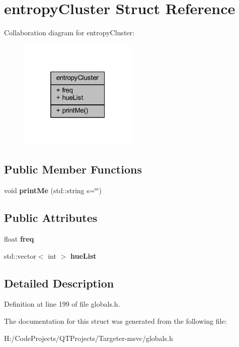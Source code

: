 \hypertarget{structentropy_cluster}{}\section{entropy\+Cluster Struct Reference}
\label{structentropy_cluster}


Collaboration diagram for entropy\+Cluster\+:
\nopagebreak
\begin{figure}[H]
\begin{center}
\leavevmode
\includegraphics[width=160pt]{structentropy_cluster__coll__graph}
\end{center}
\end{figure}
\subsection*{Public Member Functions}
\begin{DoxyCompactItemize}
\item 
\mbox{\label{structentropy_cluster_ac7bd664b978fbd56bea06eeadea3811c}} 
void {\bfseries print\+Me} (std\+::string s=\char`\"{}\char`\"{})
\end{DoxyCompactItemize}
\subsection*{Public Attributes}
\begin{DoxyCompactItemize}
\item 
\mbox{\label{structentropy_cluster_a3c49f6a3e21a396c409973ddf5a6c93e}} 
float {\bfseries freq}
\item 
\mbox{\label{structentropy_cluster_a3883cd312666c9aa28dfdd57f7bb5496}} 
std\+::vector$<$ int $>$ {\bfseries hue\+List}
\end{DoxyCompactItemize}


\subsection{Detailed Description}


Definition at line 199 of file globals.\+h.



The documentation for this struct was generated from the following file\+:\begin{DoxyCompactItemize}
\item 
H\+:/\+Code\+Projects/\+Q\+T\+Projects/\+Targeter-\/msvc/globals.\+h\end{DoxyCompactItemize}
